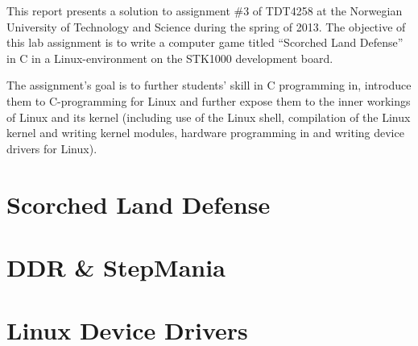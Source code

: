 This report presents a solution to assignment \#3 of TDT4258 at the Norwegian University of Technology and Science during the spring of 2013. The objective of this lab assignment is to write a computer game titled ``Scorched Land Defense'' in C in a Linux-environment on the STK1000 development board. 

The assignment's goal is to further students' skill in C programming in, introduce them to C-programming for Linux and further expose them to the inner workings of Linux and its kernel (including use of the Linux shell, compilation of the Linux kernel and writing kernel modules, hardware programming in and writing device drivers for Linux).

\section{Scorched Land Defense}
	

\section{DDR \& StepMania}
	
\section{Linux Device Drivers}
	
	